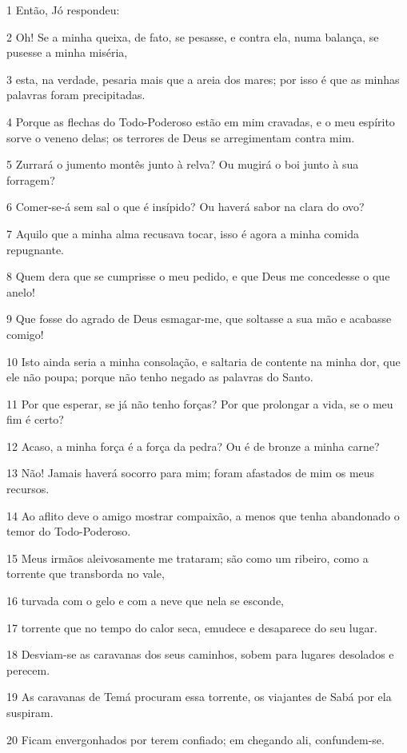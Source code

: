 \par 1 Então, Jó respondeu:
\par 2 Oh! Se a minha queixa, de fato, se pesasse, e contra ela, numa balança, se pusesse a minha miséria,
\par 3 esta, na verdade, pesaria mais que a areia dos mares; por isso é que as minhas palavras foram precipitadas.
\par 4 Porque as flechas do Todo-Poderoso estão em mim cravadas, e o meu espírito sorve o veneno delas; os terrores de Deus se arregimentam contra mim.
\par 5 Zurrará o jumento montês junto à relva? Ou mugirá o boi junto à sua forragem?
\par 6 Comer-se-á sem sal o que é insípido? Ou haverá sabor na clara do ovo?
\par 7 Aquilo que a minha alma recusava tocar, isso é agora a minha comida repugnante.
\par 8 Quem dera que se cumprisse o meu pedido, e que Deus me concedesse o que anelo!
\par 9 Que fosse do agrado de Deus esmagar-me, que soltasse a sua mão e acabasse comigo!
\par 10 Isto ainda seria a minha consolação, e saltaria de contente na minha dor, que ele não poupa; porque não tenho negado as palavras do Santo.
\par 11 Por que esperar, se já não tenho forças? Por que prolongar a vida, se o meu fim é certo?
\par 12 Acaso, a minha força é a força da pedra? Ou é de bronze a minha carne?
\par 13 Não! Jamais haverá socorro para mim; foram afastados de mim os meus recursos.
\par 14 Ao aflito deve o amigo mostrar compaixão, a menos que tenha abandonado o temor do Todo-Poderoso.
\par 15 Meus irmãos aleivosamente me trataram; são como um ribeiro, como a torrente que transborda no vale,
\par 16 turvada com o gelo e com a neve que nela se esconde,
\par 17 torrente que no tempo do calor seca, emudece e desaparece do seu lugar.
\par 18 Desviam-se as caravanas dos seus caminhos, sobem para lugares desolados e perecem.
\par 19 As caravanas de Temá procuram essa torrente, os viajantes de Sabá por ela suspiram.
\par 20 Ficam envergonhados por terem confiado; em chegando ali, confundem-se.
